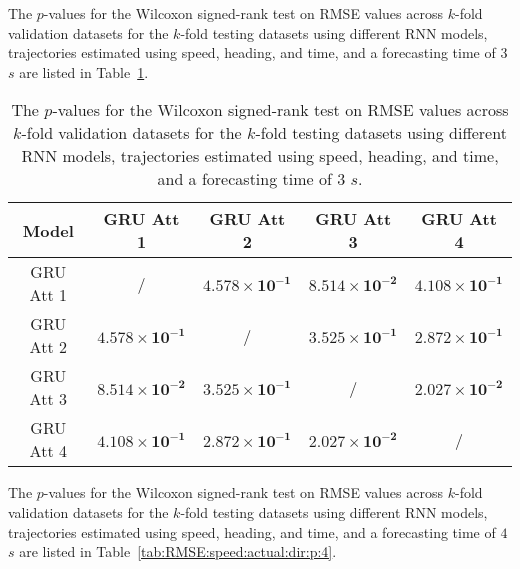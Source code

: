 The $p$-values for the Wilcoxon signed-rank test on RMSE values across $k$-fold validation datasets for the $k$-fold testing datasets using different RNN models, trajectories estimated using speed, heading, and time, and a forecasting time of $3$ $s$ are listed in Table~\ref{tab:RMSE:speed:actual:dir:p:3}.

\begin{table}[!ht]
	\centering
	\begin{tabular}{|c|c|c|c|c|}
		\hline
		Model & GRU Att 1 & GRU Att 2 & GRU Att 3 & GRU Att 4 \\ \hline
		GRU Att 1 & / & $\mathbf{4.578 \times 10^{-1}}$ & $\mathbf{8.514 \times 10^{-2}}$ & $\mathbf{4.108 \times 10^{-1}}$ \\ \hline
		GRU Att 2 & $\mathbf{4.578 \times 10^{-1}}$ & / & $\mathbf{3.525 \times 10^{-1}}$ & $\mathbf{2.872 \times 10^{-1}}$ \\ \hline
		GRU Att 3 & $\mathbf{8.514 \times 10^{-2}}$ & $\mathbf{3.525 \times 10^{-1}}$ & / & $\mathbf{2.027 \times 10^{-2}}$ \\ \hline
		GRU Att 4 & $\mathbf{4.108 \times 10^{-1}}$ & $\mathbf{2.872 \times 10^{-1}}$ & $\mathbf{2.027 \times 10^{-2}}$ & / \\ \hline
	\end{tabular}
	\caption{The $p$-values for the Wilcoxon signed-rank test on RMSE values across $k$-fold validation datasets for the $k$-fold testing datasets using different RNN models, trajectories estimated using speed, heading, and time, and a forecasting time of $3$ $s$.}
	\label{tab:RMSE:speed:actual:dir:p:3}
\end{table}

The $p$-values for the Wilcoxon signed-rank test on RMSE values across $k$-fold validation datasets for the $k$-fold testing datasets using different RNN models, trajectories estimated using speed, heading, and time, and a forecasting time of $4$ $s$ are listed in Table~\ref{tab:RMSE:speed:actual:dir:p:4}.

